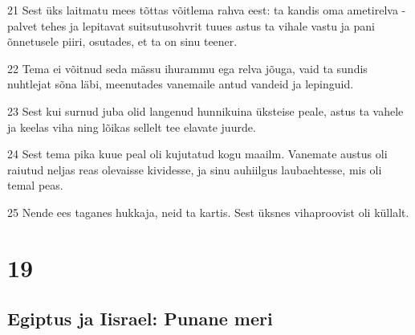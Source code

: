 \par 21 Sest üks laitmatu mees tõttas võitlema rahva eest: ta kandis oma ametirelva - palvet tehes ja lepitavat suitsutusohvrit tuues astus ta vihale vastu ja pani õnnetusele piiri, osutades, et ta on sinu teener.
\par 22 Tema ei võitnud seda mässu ihurammu ega relva jõuga, vaid ta sundis nuhtlejat sõna läbi, meenutades vanemaile antud vandeid ja lepinguid.
\par 23 Sest kui surnud juba olid langenud hunnikuina üksteise peale, astus ta vahele ja keelas viha ning lõikas sellelt tee elavate juurde.
\par 24 Sest tema pika kuue peal oli kujutatud kogu maailm. Vanemate austus oli raiutud neljas reas olevaisse kividesse, ja sinu auhiilgus laubaehtesse, mis oli temal peas.
\par 25 Nende ees taganes hukkaja, neid ta kartis. Sest üksnes vihaproovist oli küllalt. 

\chapter{19} 

\section*{Egiptus ja Iisrael: Punane meri}

